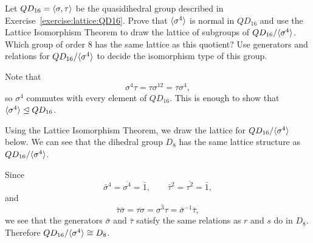  Let $QD_{16} = \langle{\sigma,\tau}\rangle$ be the quasidihedral
group described in Exercise~\ref{exercise:lattice:QD16}. Prove that
$\langle{\sigma^4}\rangle$ is normal in $QD_{16}$ and use the Lattice
Isomorphism Theorem to draw the lattice of subgroups of
$QD_{16}/\langle{\sigma^4}\rangle$. Which group of order $8$ has the same
lattice as this quotient? Use generators and relations for
$QD_{16}/\langle{\sigma^4}\rangle$ to decide the isomorphism type of this group.
\begin{solution}
  Note that
  \begin{equation*}
    \sigma^4\tau = \tau\sigma^{12} = \tau\sigma^4,
  \end{equation*}
  so $\sigma^4$ commutes with every element of $QD_{16}$. This is
  enough to show that $\langle{\sigma^4}\rangle\trianglelefteq QD_{16}$.

  Using the Lattice Isomorphism Theorem, we draw the lattice for
  $QD_{16}/\langle{\sigma^4}\rangle$ below. We can see that the dihedral group
  $D_8$ has the same lattice structure as $QD_{16}/\langle{\sigma^4}\rangle$.

  Since
  \begin{equation*}
    \bar\sigma^4 = \overline{\sigma^4} = \bar1,
    \qquad
    \bar\tau^2 = \overline{\tau^2} = \bar1,
  \end{equation*}
  and
  \begin{equation*}
    \bar\tau\bar\sigma = \overline{\tau\sigma}
    = \overline{\sigma^3\tau}
    = \bar\sigma^{-1}\bar\tau,
  \end{equation*}
  we see that the generators $\bar\sigma$ and $\bar\tau$ satisfy the
  same relations as $r$ and $s$ do in $D_8$. Therefore
  $QD_{16}/\langle{\sigma^4}\rangle\cong D_8$.
  \begin{center}
  \end{center}
\end{solution}

